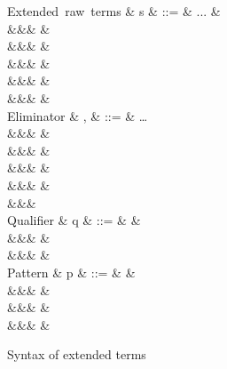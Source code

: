 \begin{figure}[H]
\begin{syntaxfig}
\mbox{Extended raw terms}
&
s
&
::=
&
...
&
\\
&&&
&
\\
&&&
&
\\
&&&
&
\\
&&&
&
\\
&&&
\exLambda{\sigma}
&
\\[2mm]

\mbox{Eliminator}
&
\sigma, \tau
&
::=
&
\ldots
\\
&&&
\elimBoolTrue{\kappa}
&
\\
&&&
\elimBoolFalse{\kappa}
&
\\
&&&
\elimListSingleton{\branchNil{\kappa}}
&
\\
&&&
\elimListSingleton{\branchCons{\sigma}}
&
\\
&&&
\\[2mm]

\mbox{Qualifier}
&
q
&
::=
&
&
\\
&&&
&
\\
&&&
&
\\[2mm]


\mbox{Pattern}
&
p
&
::=
&
&
\\
&&&
&
\\
&&&
\pattNil
&
\\
&&&
&
\\[2mm]
\end{syntaxfig}
\caption{Syntax of extended terms}
\end{figure}
